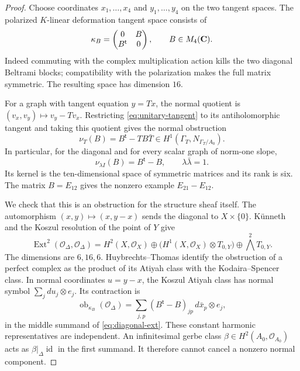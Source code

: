 \begin{proof}
Choose coordinates $x_1,\ldots,x_4$ and $y_1,\ldots,y_4$ on the two tangent spaces. The polarized $K$-linear deformation tangent space consists of
\begin{equation}\label{eq:unitary-tangent}
 \kappa_B=\begin{pmatrix}0&B\\B^{\mathsf t}&0\end{pmatrix},
 \qquad B\in M_4(\mathbf C).
\end{equation}
Indeed commuting with the complex multiplication action kills the two diagonal Beltrami blocks; compatibility with the polarization makes the full matrix symmetric. The resulting space has dimension $16$.

For a graph with tangent equation $y=Tx$, the normal quotient is $(v_x,v_y)\mapsto v_y-Tv_x$. Restricting \eqref{eq:unitary-tangent} to its antiholomorphic tangent and taking this quotient gives the normal obstruction
\[
 \nu_T(B)=B^{\mathsf t}-TB\bar T
 \in H^1(\Gamma_T,N_{\Gamma_T/A_0}).
\]
In particular, for the diagonal and for every scalar graph of norm-one slope,
\begin{equation}\label{eq:graph-normal-obstruction}
 \nu_{\lambda I}(B)=B^{\mathsf t}-B,
 \qquad \lambda\bar\lambda=1.
\end{equation}
Its kernel is the ten-dimensional space of symmetric matrices and its rank is six. The matrix $B=E_{12}$ gives the nonzero example $E_{21}-E_{12}$.

We check that this is an obstruction for the structure sheaf itself. The automorphism $(x,y)\mapsto(x,y-x)$ sends the diagonal to $X\times\{0\}$. K\"unneth and the Koszul resolution of the point of $Y$ give
\begin{equation}\label{eq:diagonal-ext}
 \operatorname{Ext}^2(\mathcal O_\Delta,\mathcal O_\Delta)
 =H^2(X,\mathcal O_X)
 \oplus\bigl(H^1(X,\mathcal O_X)\otimes T_{0,Y}\bigr)
 \oplus\bigwedge^2T_{0,Y}.
\end{equation}
The dimensions are $6,16,6$. Huybrechts--Thomas \cite[Corollary~3.4, manuscript p.~14]{HT} identify the obstruction of a perfect complex as the product of its Atiyah class with the Kodaira--Spencer class. In normal coordinates $u=y-x$, the Koszul Atiyah class has normal symbol $\sum_jdu_j\otimes e_j$. Its contraction is
\[
 \operatorname{ob}_{\kappa_B}(\mathcal O_\Delta)
 =\sum_{j,p}(B^{\mathsf t}-B)_{jp}\,
 d\bar x_p\otimes e_j,
\]
in the middle summand of \eqref{eq:diagonal-ext}. These constant harmonic representatives are independent. An infinitesimal gerbe class $\beta\in H^2(A_0,\mathcal O_{A_0})$ acts as $\beta|_\Delta\operatorname{id}$ in the first summand. It therefore cannot cancel a nonzero normal component.


\end{proof}
